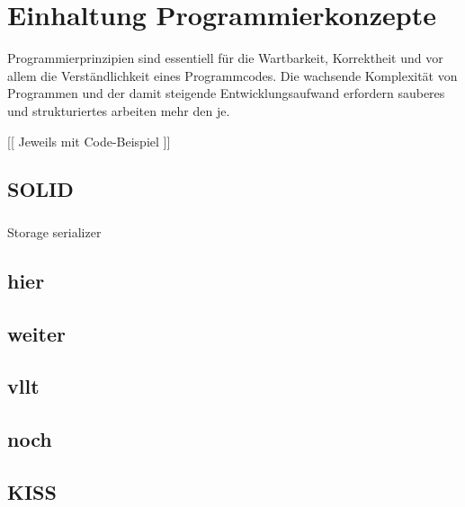 
\section{Einhaltung Programmierkonzepte}

Programmierprinzipien sind essentiell für die Wartbarkeit, Korrektheit und vor allem die Verständlichkeit eines Programmcodes. Die wachsende Komplexität von Programmen und der damit steigende Entwicklungsaufwand erfordern sauberes und strukturiertes arbeiten mehr den je. 


[[ Jeweils mit Code-Beispiel ]]

\subsection{SOLID}
\subsubsection{\textPrincipleSingleResponsibility}
\label{\textPrincipleSingleResponsibility}
Storage serializer

\subsubsection{\textPrincipleOpenClosed}
\label{\textPrincipleOpenClosed}

\subsubsection{\textPrincipleLiskovSubstitution}
\label{\textPrincipleLiskovSubstitution}


\subsubsection{\textPrincipleInterfaceSegregation}
\label{\textPrincipleInterfaceSegregation}

\subsubsection{\textPrincipleDependencyInversion}
\label{\textPrincipleDependencyInversion}

\subsection{hier}
\subsection{weiter}
\subsection{vllt}
\subsection{noch}
\subsection{KISS}
